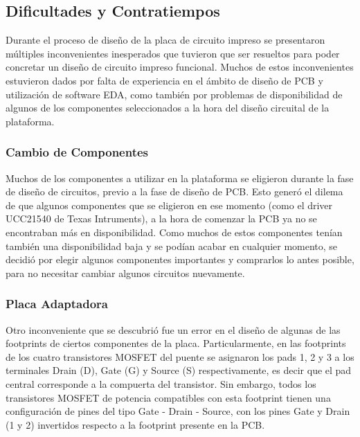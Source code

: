 \subsection{Dificultades y Contratiempos}

Durante el proceso de diseño de la placa de circuito impreso se presentaron múltiples inconvenientes inesperados que tuvieron que ser resueltos para poder concretar un diseño de circuito impreso funcional. Muchos de estos inconvenientes estuvieron dados por falta de experiencia en el ámbito de diseño de PCB y utilización de software EDA, como también por problemas de disponibilidad de algunos de los componentes seleccionados a la hora del diseño circuital de la plataforma.\\

\subsubsection{Cambio de Componentes}

Muchos de los componentes a utilizar en la plataforma se eligieron durante la fase de diseño de circuitos, previo a la fase de diseño de PCB. Esto generó el dilema de que algunos componentes que se eligieron en ese momento (como el driver UCC21540 de Texas Intruments), a la hora de comenzar la PCB ya no se encontraban más en disponibilidad. Como muchos de estos componentes tenían también una disponibilidad baja y se podían acabar en cualquier momento, se decidió por elegir algunos componentes importantes y comprarlos lo antes posible, para no necesitar cambiar algunos circuitos nuevamente.\\

\subsubsection{Placa Adaptadora}

Otro inconveniente que se descubrió fue un error en el diseño de algunas de las footprints de ciertos componentes de la placa. Particularmente, en las footprints de los cuatro transistores MOSFET del puente se asignaron los pads 1, 2 y 3 a los terminales Drain (D), Gate (G) y Source (S) respectivamente, es decir que el pad central corresponde a la compuerta del transistor. Sin embargo, todos los transistores MOSFET de potencia compatibles con esta footprint tienen una configuración de pines del tipo Gate - Drain - Source, con los pines Gate y Drain (1 y 2) invertidos respecto a la footprint presente en la PCB.\\

